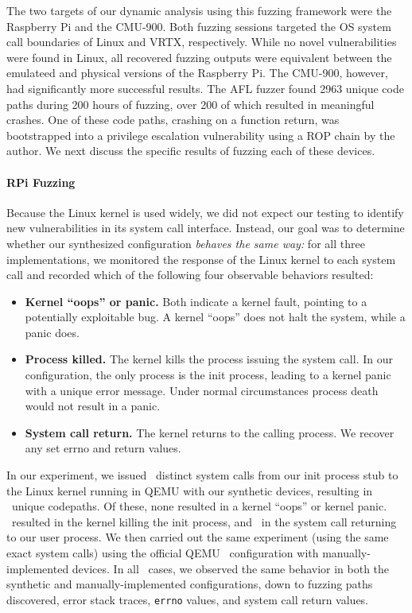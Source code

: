 The two targets of our dynamic analysis using this fuzzing framework were the Raspberry Pi and the CMU-900.
Both fuzzing sessions targeted the OS system call boundaries of Linux and VRTX, respectively.
While no novel vulnerabilities were found in Linux, all recovered fuzzing outputs were equivalent between the emulateed and physical versions of the Raspberry Pi.
The CMU-900, however, had significantly more successful results.
The AFL fuzzer found 2963 unique code paths during 200 hours of fuzzing, over 200 of which resulted in meaningful crashes.
One of these code paths, crashing on a function return, was bootstrapped into a privilege escalation vulnerability using a ROP chain by the author.
We next discuss the specific results of fuzzing each of these devices.

\paragraph{RPi Fuzzing}

Because the Linux kernel is used widely, we did not expect our testing to identify new vulnerabilities in its system call interface. Instead, our goal was to determine whether our synthesized configuration \emph{behaves the same way:} for all three implementations, we monitored the response of the Linux kernel to each system call and recorded which of the following four observable behaviors resulted:

\begin{itemize}[itemsep=0pt, leftmargin=18pt]
\item \textbf{Kernel ``oops'' or panic.} Both indicate a kernel fault, pointing to a potentially exploitable bug. A kernel ``oops'' does not halt the system, while a panic does.
\item \textbf{Process killed.} The kernel kills the process issuing the system call. In our configuration, the only process is the init process, leading to a kernel panic with a unique error message. Under normal circumstances process death would not result in a panic.
\item \textbf{System call return.} The kernel returns to the calling process. We recover any set errno and return values.
\end{itemize}

In our experiment, we issued \rpiDistinctSyscalls\ distinct system calls from our init process stub to the Linux kernel running in QEMU with our synthetic devices, resulting in \rpiNumPathsDiscovered\ unique codepaths. Of these, none resulted in a kernel ``oops'' or kernel panic. \rpiNumDeaths\ resulted in the kernel killing the init process, and \rpiNumReturns\ in the system call returning to our user process. 
We then carried out the same experiment (using the same exact system calls) using the official QEMU \rpitwo\ configuration with manually-implemented devices.
In all \rpiNumPathsDiscovered\ cases, we observed the same behavior in both the synthetic and manually-implemented configurations, down to fuzzing paths discovered, error stack traces, \texttt{errno} values, and system call return values.

